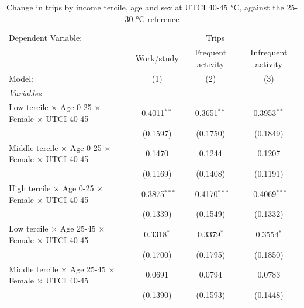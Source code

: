 
\begin{table}[htbp]
   \caption{\label{table_intersectionality_40-45} Change in trips by income tercile, age and sex at UTCI 40-45 °C, against the 25-30 °C reference}
   \centering
   \scriptsize
   \renewcommand*{\arraystretch}{0.75}
   \begin{tabular}{lccc}
      \tabularnewline \midrule \midrule
      Dependent Variable: & \multicolumn{3}{c}{Trips}\\
                                                                                & Work/study      & Frequent activity & Infrequent activity \\   
      Model:                                                                    & (1)             & (2)               & (3)\\  
      \midrule
      \emph{Variables}\\
      Low tercile $\times$ Age 0-25 $\times$ Female $\times$ UTCI 40-45         & 0.4011$^{**}$   & 0.3651$^{**}$     & 0.3953$^{**}$\\   
                                                                                & (0.1597)        & (0.1750)          & (0.1849)\\   
      Middle tercile $\times$ Age 0-25 $\times$ Female $\times$ UTCI 40-45      & 0.1470          & 0.1244            & 0.1207\\   
                                                                                & (0.1169)        & (0.1408)          & (0.1191)\\   
      High tercile $\times$ Age 0-25 $\times$ Female $\times$ UTCI 40-45        & -0.3875$^{***}$ & -0.4170$^{***}$   & -0.4069$^{***}$\\   
                                                                                & (0.1339)        & (0.1549)          & (0.1332)\\   
      Low tercile $\times$ Age 25-45 $\times$ Female $\times$ UTCI 40-45        & 0.3318$^{*}$    & 0.3379$^{*}$      & 0.3554$^{*}$\\   
                                                                                & (0.1700)        & (0.1795)          & (0.1850)\\   
      Middle tercile $\times$ Age 25-45 $\times$ Female $\times$ UTCI 40-45     & 0.0691          & 0.0794            & 0.0783\\   
                                                                                & (0.1390)        & (0.1593)          & (0.1448)\\   

\end{tabular}
\end{table}
